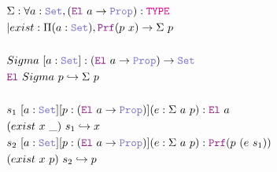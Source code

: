 \begin{figure}
\begin{framed}
\begin{align*}
&\Sigma : \forall a : \set{}, (\el{}~a \ra \prop): \type \\
&| exist : \Pi (a : \set{}), \prf (p~x) \ra \Sigma~p \\
&\\
& Sigma~[a: \set{}]: (\el{}~a \ra \prop) \ra \set{} \\
& \el{}~Sigma~p \re \Sigma~p \\
&\\
& s_1~[a: \set{}] [p:(\el{}~a \ra \prop)] (e: \Sigma~a~p): \el{}~a \\
& (exist~x~\_)~s_1 \re x\\
& s_2~[a: \set{}] [p:(\el{}~a \ra \prop)] (e: \Sigma~a~p): \prf{}(p~(e~s_1)) \\
& (exist~x~p)~s_2 \re p\\
\end{align*}



\end{framed}
\end{figure}
